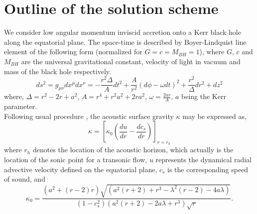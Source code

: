 \documentclass[10pt,authoryear]{article}
\begin{document}
\section{Outline of the solution scheme}
We consider low angular momentum inviscid accretion onto a Kerr black hole along the equatorial plane. The space-time is described 
by Boyer-Lindquist line element of the following form (normalized for $G=c=M_{BH}=1$), where $G$, $c$ and $M_{BH}$ are the universal 
gravitational constant, velocity of light in vacuum and mass of the black hole respectively. 
\begin{equation}
ds^2=g_{\mu \nu}dx^\mu dx^\nu=-\frac{r^2\Delta}{A}dt^2+\frac{A}{r^2}(d\phi-\omega dt)^2+\frac{r^2}{\Delta}dr^2+dz^2
\label{eqn1}
\end{equation} 
where, $\Delta=r^2-2r+a^2$, $A=r^4+r^2a^2+2ra^2$, $\omega=\frac{2ar}{A}$, $a$ being the Kerr parameter. \\
Following usual procedure 
, the acoustic surface gravity $\kappa$ may be expressed as, 
\begin{equation}
\kappa=\left[\kappa_0\left(\frac{du}{dr}-\frac{dc_s}{dr}\right)\right]_{r=r_h}
\label{eqn2}
\end{equation}
where $r_h$ denotes the location of the acoustic horizon, which actually is the location of the sonic point for a transonic flow, 
$u$ represents the dynamical radial advective velocity defined on the equatorial plane, 
$c_s$ is the corresponding speed of sound, and
\begin{equation}
\kappa_0=\frac{\left(a^2+(r-2) r\right)\sqrt{\left(a^2 (r+2)+r^3-\lambda ^2 (r-2)-4 a \lambda\right)}}{\left(1-c_s^2\right) \left(a^2 (r+2)-2 a \lambda +r^3\right)\sqrt{r}}.
\label{eqn3}
\end{equation}
\end{document}
